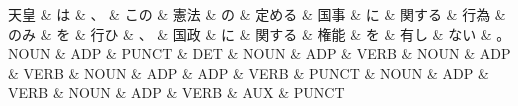 \documentclass[tikz,border=5pt]{standalone}
\begin{document}
\normalsize
\begin{dependency}[edge unit distance=12.0pt]
    \begin{deptext}[column sep=1em]
        天皇 \& は \& 、 \& この \& 憲法 \& の \& 定める \& 国事 \& に \& 関する \& 行為 \& のみ \& を \& 行ひ \& 、 \& 国政 \& に \& 関する \& 権能 \& を \& 有し \& ない \& 。\\
        NOUN \& ADP \& PUNCT \& DET \& NOUN \& ADP \& VERB \& NOUN \& ADP \& VERB \& NOUN \& ADP \& ADP \& VERB \& PUNCT \& NOUN \& ADP \& VERB \& NOUN \& ADP \& VERB \& AUX \& PUNCT\\
    \end{deptext}
\end{dependency}
\end{document}
